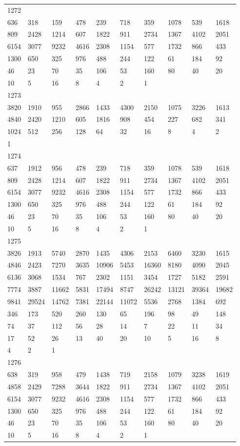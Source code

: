 \begin{longtable}{*{10}{l}}
1272&&&&&&&&&\\
636& 318& 159& 478& 239& 718& 359& 1078& 539& 1618\\
809& 2428& 1214& 607& 1822& 911& 2734& 1367& 4102& 2051\\
6154& 3077& 9232& 4616& 2308& 1154& 577& 1732& 866& 433\\
1300& 650& 325& 976& 488& 244& 122& 61& 184& 92\\
46& 23& 70& 35& 106& 53& 160& 80& 40& 20\\
10& 5& 16& 8& 4& 2& 1& \\

1273&&&&&&&&&\\
3820& 1910& 955& 2866& 1433& 4300& 2150& 1075& 3226& 1613\\
4840& 2420& 1210& 605& 1816& 908& 454& 227& 682& 341\\
1024& 512& 256& 128& 64& 32& 16& 8& 4& 2\\
1& \\

1274&&&&&&&&&\\
637& 1912& 956& 478& 239& 718& 359& 1078& 539& 1618\\
809& 2428& 1214& 607& 1822& 911& 2734& 1367& 4102& 2051\\
6154& 3077& 9232& 4616& 2308& 1154& 577& 1732& 866& 433\\
1300& 650& 325& 976& 488& 244& 122& 61& 184& 92\\
46& 23& 70& 35& 106& 53& 160& 80& 40& 20\\
10& 5& 16& 8& 4& 2& 1& \\

1275&&&&&&&&&\\
3826& 1913& 5740& 2870& 1435& 4306& 2153& 6460& 3230& 1615\\
4846& 2423& 7270& 3635& 10906& 5453& 16360& 8180& 4090& 2045\\
6136& 3068& 1534& 767& 2302& 1151& 3454& 1727& 5182& 2591\\
7774& 3887& 11662& 5831& 17494& 8747& 26242& 13121& 39364& 19682\\
9841& 29524& 14762& 7381& 22144& 11072& 5536& 2768& 1384& 692\\
346& 173& 520& 260& 130& 65& 196& 98& 49& 148\\
74& 37& 112& 56& 28& 14& 7& 22& 11& 34\\
17& 52& 26& 13& 40& 20& 10& 5& 16& 8\\
4& 2& 1& \\

1276&&&&&&&&&\\
638& 319& 958& 479& 1438& 719& 2158& 1079& 3238& 1619\\
4858& 2429& 7288& 3644& 1822& 911& 2734& 1367& 4102& 2051\\
6154& 3077& 9232& 4616& 2308& 1154& 577& 1732& 866& 433\\
1300& 650& 325& 976& 488& 244& 122& 61& 184& 92\\
46& 23& 70& 35& 106& 53& 160& 80& 40& 20\\
10& 5& 16& 8& 4& 2& 1& \\


\end{longtable}

